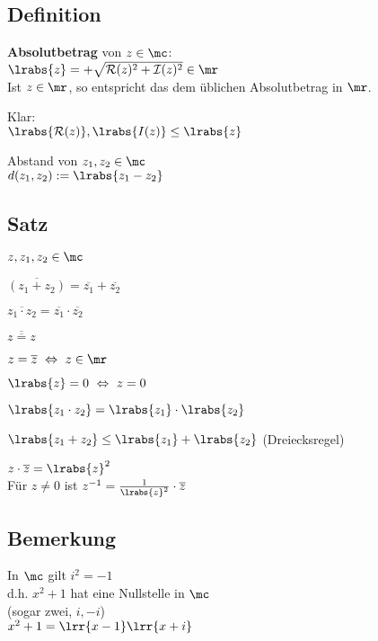 \subsection{Definition}
		\item \textbf{Absolutbetrag} von $z\in\mc$:\\
		$\lrabs{z}=+\sqrt{\mathcal{R}(z)^2+\mathcal{I}(z)^2}\in\mr$\\
		Ist $z\in\mr$, so entspricht das dem üblichen Absolutbetrag in $\mr$.
		
		Klar:\\
		$\lrabs{\mathcal{R}(z)},\lrabs{I(z)}\leq\lrabs{z}$
			
		\item Abstand von $z_1,z_2\in\mc$\\
		$d(z_1,z_2):=\lrabs{z_1-z_2}$
		
	\subExEnd

\subsection{Satz}
	$z,z_1,z_2\in\mc$
		\item $\overline{(z_1+z_2)}=\overline{z_1}+\overline{z_2}$
		\item $\overline{z_1\cdot z_2}=\overline{z_1}\cdot\overline{z_2}$
		\item $\overline{\overline{z=z}}$
		\item $z=\overline{z}\ \Leftrightarrow\ z\in\mr$
		\item $\lrabs{z}=0\ \Leftrightarrow\ z=0$
		\item $\lrabs{z_1\cdot z_2}=\lrabs{z_1}\cdot\lrabs{z_2}$
		\item $\lrabs{z_1+z_2}\leq\lrabs{z_1}+\lrabs{z_2}$ (Dreiecksregel)
		\item $z\cdot\overline{z}=\lrabs{z}^2$\\
		Für $z\neq 0$ ist $z^{-1}=\frac{1}{\lrabs{z}^2}\cdot\overline{z}$
	\subExEnd

\subsection{Bemerkung}
		\item In $\mc$ gilt $i^2=-1$\\
			d.h. $x^2+1$ hat eine Nullstelle in $\mc$\\
			(sogar zwei, $i,-i$)\\
			$x^2+1=\lrr{x-1}\lrr{x+i}$
			
